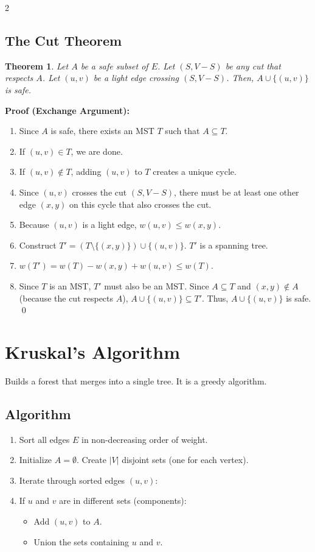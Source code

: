 \documentclass[10pt, a4paper]{article}
\newtheorem*{theorem}{Theorem}
\begin{document}
\begin{multicols*}{2}
\subsection{The Cut Theorem}
\begin{theorem}
Let $A$ be a safe subset of $E$. Let $(S, V-S)$ be any cut that respects $A$. Let $(u, v)$ be a light edge crossing $(S, V-S)$. Then, $A \cup \{(u, v)\}$ is safe.
\end{theorem}

\textbf{Proof (Exchange Argument):}
\begin{enumerate}[leftmargin=*]
    \item Since $A$ is safe, there exists an MST $T$ such that $A \subseteq T$.
    \item If $(u, v) \in T$, we are done.
    \item If $(u, v) \notin T$, adding $(u, v)$ to $T$ creates a unique cycle.
    \item Since $(u, v)$ crosses the cut $(S, V-S)$, there must be at least one other edge $(x, y)$ on this cycle that also crosses the cut.
    \item Because $(u, v)$ is a light edge, $w(u, v) \le w(x, y)$.
    \item Construct $T' = (T \setminus \{(x, y)\}) \cup \{(u, v)\}$. $T'$ is a spanning tree.
    \item $w(T') = w(T) - w(x, y) + w(u, v) \le w(T)$.
    \item Since $T$ is an MST, $T'$ must also be an MST. Since $A \subseteq T$ and $(x, y) \notin A$ (because the cut respects $A$), $A \cup \{(u, v)\} \subseteq T'$. Thus, $A \cup \{(u, v)\}$ is safe. \qed
\end{enumerate}

\section{Kruskal's Algorithm}
Builds a forest that merges into a single tree. It is a greedy algorithm.

\subsection{Algorithm}
\begin{enumerate}[leftmargin=*]
    \item Sort all edges $E$ in non-decreasing order of weight.
    \item Initialize $A = \emptyset$. Create $|V|$ disjoint sets (one for each vertex).
    \item Iterate through sorted edges $(u, v)$:
    \item If $u$ and $v$ are in different sets (components):
    \begin{itemize}
        \item Add $(u, v)$ to $A$.
        \item Union the sets containing $u$ and $v$.
    \end{itemize}
\end{enumerate}


\end{multicols*}
\end{document}
